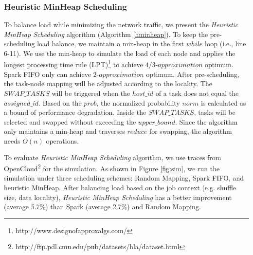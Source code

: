 \subsubsection{Heuristic MinHeap Scheduling}\label{h-minheap}
To balance load while minimizing the network traffic, we present the \textit{Heuristic MinHeap Scheduling} algorithm (Algorithm \ref{hminheap}).
{\color{black}
To keep the pre-scheduling load balance, we maintain a min-heap in the first $while$ loop (i.e., line 6-11).
We use the min-heap to simulate the load of each node and applies the longest processing time rule (LPT)\footnote{http://www.designofapproxalgs.com/} to achieve $4/3\text{-}approximation$ optimum.
Spark FIFO only can achieve $2\text{-}approximation$ optimum.
}
After pre-scheduling, the task-node mapping will be adjusted according to the locality. 
The $SWAP\_TASKS$ will be triggered when the $host\_id$ of a task does not equal the $assigned\_id$.
Based on the $prob$, the normalized probability $norm$ is calculated as a bound of performance degradation. 
Inside the $SWAP\_TASKS$, tasks will be selected and swapped without exceeding the $upper\_bound$.
Since the algorithm only maintains a min-heap and traverses $reduce$ for swapping, the algorithm needs $O(n)$ operations. 

{\color{black}
To evaluate \textit{Heuristic MinHeap Scheduling} algorithm, we use traces from OpenCloud\footnote{\label{fn:trace}http://ftp.pdl.cmu.edu/pub/datasets/hla/dataset.html} for the simulation.
As shown in Figure \ref{fig:sim}, we run the simulation under three scheduling schemes: Random Mapping, Spark FIFO, and heuristic MinHeap.
After balancing load based on the job context (e.g. shuffle size, data locality), \textit{Heuristic MinHeap Scheduling} has a better improvement (average 5.7\%) than Spark (average 2.7\%) and Random Mapping.
}

